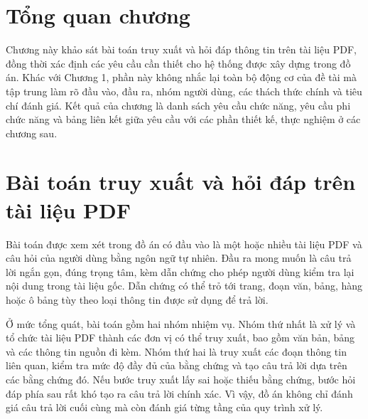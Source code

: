 \documentclass[../DoAn.tex]{subfiles}
\begin{document}
\section{Tổng quan chương}

Chương này khảo sát bài toán truy xuất và hỏi đáp thông tin trên tài liệu PDF,
đồng thời xác định các yêu cầu cần thiết cho hệ thống được xây dựng trong đồ án.
Khác với Chương 1, phần này không nhắc lại toàn bộ động cơ của đề tài mà tập
trung làm rõ đầu vào, đầu ra, nhóm người dùng, các thách thức chính và tiêu chí
đánh giá. Kết quả của chương là danh sách yêu cầu chức năng, yêu cầu phi chức
năng và bảng liên kết giữa yêu cầu với các phần thiết kế, thực nghiệm ở các
chương sau.

\section{Bài toán truy xuất và hỏi đáp trên tài liệu PDF}
\label{section:pdf-qa-problem}

Bài toán được xem xét trong đồ án có đầu vào là một hoặc nhiều tài liệu PDF và
câu hỏi của người dùng bằng ngôn ngữ tự nhiên. Đầu ra mong muốn là câu trả lời
ngắn gọn, đúng trọng tâm, kèm dẫn chứng cho phép người dùng kiểm tra lại nội
dung trong tài liệu gốc. Dẫn chứng có thể trỏ tới trang, đoạn văn, bảng, hàng hoặc
ô bảng tùy theo loại thông tin được sử dụng để trả lời.

Ở mức tổng quát, bài toán gồm hai nhóm nhiệm vụ. Nhóm thứ nhất là xử lý và tổ
chức tài liệu PDF thành các đơn vị có thể truy xuất, bao gồm văn bản, bảng và các
thông tin nguồn đi kèm. Nhóm thứ hai là truy xuất các đoạn thông tin liên quan,
kiểm tra mức độ đầy đủ của bằng chứng và tạo câu trả lời dựa trên các bằng chứng
đó. Nếu bước truy xuất lấy sai hoặc thiếu bằng chứng, bước hỏi đáp phía sau rất
khó tạo ra câu trả lời chính xác. Vì vậy, đồ án không chỉ đánh giá câu trả lời cuối
cùng mà còn đánh giá từng tầng của quy trình xử lý.
\end{document}
